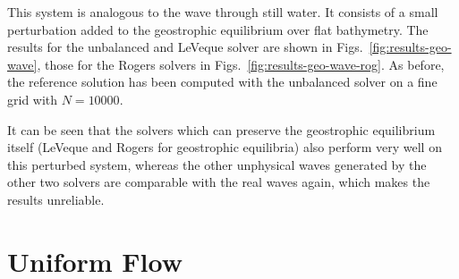 This system is analogous to the wave through still water. It consists of a small perturbation added to the geostrophic equilibrium over flat bathymetry. The results for the unbalanced and LeVeque solver are shown in Figs.~\ref{fig:results-geo-wave}, those for the Rogers solvers in Figs.~\ref{fig:results-geo-wave-rog}. As before, the reference solution has been computed with the unbalanced solver on a fine grid with $N = 10000$.

It can be seen that the solvers which can preserve the geostrophic equilibrium itself (LeVeque and Rogers for geostrophic equilibria) also perform very well on this perturbed system, whereas the other unphysical waves generated by the other two solvers are comparable with the real waves again, which makes the results unreliable.

\section{Uniform Flow}

